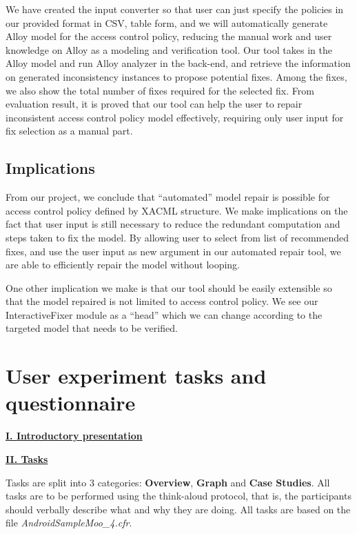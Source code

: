 \documentclass{acm_proc_article-sp}
\begin{document}
We have created the input converter so that user can just specify the policies in our provided format in CSV, table form, and we will automatically generate Alloy model for the access control policy, reducing the manual work and user knowledge on Alloy as a modeling and verification tool. Our tool takes in the Alloy model and run Alloy analyzer in the back-end, and retrieve the information on generated inconsistency instances to propose potential fixes. Among the fixes, we also show the total number of fixes required for the selected fix. From evaluation result, it is proved that our tool can help the user to repair inconsistent access control policy model effectively, requiring only user input for fix selection as a manual part. 

\subsection{Implications}

From our project, we conclude that ``automated'' model repair is possible for access control policy defined by XACML structure. We make implications on the fact that user input is still necessary to reduce the redundant computation and steps taken to fix the model. By allowing user to select from list of recommended fixes, and use the user input as new argument in our automated repair tool, we are able to efficiently repair the model without looping.

One other implication we make is that our tool should be easily extensible so that the model repaired is not limited to access control policy. We see our InteractiveFixer module as a ``head'' which we can change according to the targeted model that needs to be verified. 


{}


\appendix
\section{User experiment tasks and questionnaire} \label{A}

\underline{ \textbf{I. Introductory presentation}}

\underline{ \textbf{II. Tasks}}

Tasks are split into 3 categories: \textbf{Overview}, \textbf{Graph} and \textbf{Case Studies}. All tasks are to be performed using the think-aloud protocol, that is, the participants should verbally describe what and why they are doing. All tasks are based on the file \textit{AndroidSampleMoo\_4.cfr}.
\end{document}
